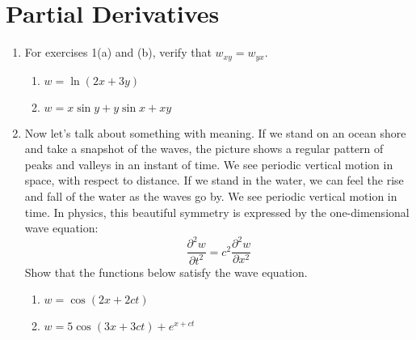 \documentclass[letterpaper, 11pt]{article}
\begin{document}
\section{Partial Derivatives}
\begin{enumerate}
\item For exercises 1(a) and (b), verify that $w_{xy} = w_{yx}$.
\begin{enumerate}[label=(\alph*)]
\item $w = \ln(2x + 3y)$

\item $w = x \sin y + y \sin x + xy$

\end{enumerate}

\item Now let's talk about something with meaning. If we stand on an ocean shore and take a snapshot of the waves, the picture shows a regular pattern of peaks and valleys in an instant of time. We see periodic vertical motion in space, with respect to distance. If we stand in the water, we can feel the rise and fall of the water as the waves go by. We see periodic vertical motion in time. In physics, this beautiful symmetry is expressed by the one-dimensional wave equation:
\[ \frac{\partial^2 w}{\partial t^2} = c^2 \frac{ \partial^2 w}{\partial x^2} \]
Show that the functions below satisfy the wave equation. 

\begin{enumerate}[label = (\alph*)]
\item $w = \cos (2x + 2ct)$

\item $w = 5 \cos( 3x + 3ct) + e^{x + ct}$


\end{enumerate}

\end{enumerate}

\end{document}
